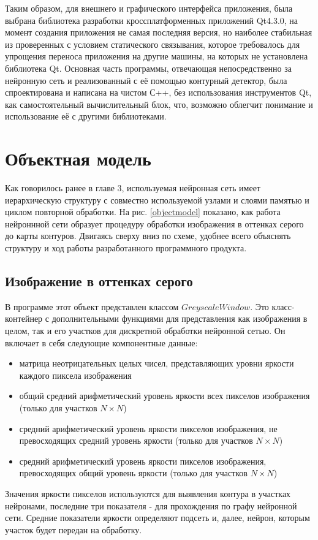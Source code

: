 \documentclass[a4paper,12pt]{report}
\begin{document}
Таким образом, для внешнего и графического интерфейса приложения, была выбрана библиотека разработки кроссплатформенных приложений Qt4.3.0, на момент создания приложения не самая последняя версия, но наиболее стабильная из проверенных с условием статического связывания, которое требовалось для упрощения переноса приложения на другие машины, на которых не установлена библиотека Qt. Основная часть программы, отвечающая непосредственно за нейронную сеть и реализованный с её помощью контурный детектор, была спроектирована и написана на чистом С++, без использования инструментов Qt, как самостоятельный вычислительный блок, что, возможно облегчит понимание и использование её с другими библиотеками. 

\section{Объектная модель}
Как говорилось ранее в главе 3, используемая нейронная сеть имеет иерархическую структуру с совместно используемой узлами и слоями памятью и циклом повторной обработки.  На рис. \ref{objectmodel} показано, как работа нейроннной сети образует процедуру обработки изображения в оттенках серого до карты контуров. Двигаясь сверху вниз по схеме, удобнее всего объяснять структуру и ход работы разработанного программного продукта.
\subsection{Изображение в оттенках серого}
В программе этот объект представлен классом $GreyscaleWindow$. Это класс-контейнер с дополнительными функциями для представления как изображения в целом, так и его участков для дискретной обработки нейронной сетью. Он включает в себя следующие компонентные данные:
\begin{itemize}
\item{матрица неотрицательных целых чисел, представляющих уровни яркости каждого пиксела изображения}
\item{общий средний арифметический уровень яркости всех пикселов изображения (только для участков $N\times N$)}
\item{средний арифметический уровень яркости пикселов изображения, не превосходящих средний уровень яркости (только для участков $N\times N$)}
\item{средний арифметический уровень яркости пикселов изображения, превосходящих общий уровень яркости (только для участков $N\times N$)}
\end{itemize}
Значения яркости пикселов используются для выявления контура в участках нейронами, последние три показателя - для прохождения по графу нейронной сети. Средние показатели яркости определяют подсеть и, далее, нейрон, которым участок будет передан на обработку.
\end{document}
